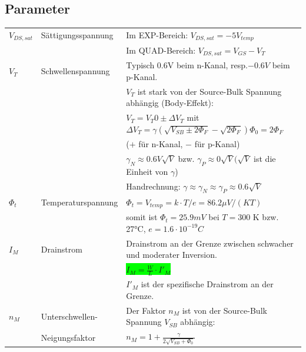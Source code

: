 \subsection{Parameter}
\begin{tabular}{| l | l | l |}
    \hline
    $V_{DS,sat}$    & Sättigungsspannung    & Im EXP-Bereich: $V_{DS,sat} = -5 V_{temp}$\\
                    &                       & Im QUAD-Bereich: $V_{DS,sat} = V_{GS} - V_T$\\
    \hline
    $V_T$           & Schwellenspannung     & Typisch 0.6V beim n-Kanal, resp.$-0.6V$ beim p-Kanal.\\
                    &                       & $V_T$ ist stark von der Source-Bulk Spannung abhängig (Body-Effekt):\\
                    &                       & $V_T = V_T0 \pm \Delta V_T$ mit $\Delta V_T = \gamma(\sqrt{V_{SB}\pm 2\Phi_F}-\sqrt{2\Phi_F})$\hspace{10pt}$\Phi_0 = 2\Phi_F$ \\ 
                    &                       & ($+$ für n-Kanal, $-$ für p-Kanal)\\
                    &                       & $\gamma_N \approx 0.6V\sqrt{V}$ bzw. $\gamma_P \approx 0\sqrt{V} (\sqrt{V}$ ist die Einheit von $\gamma$)\\
                    &                       & Handrechnung: $\gamma \approx\gamma_N \approx\gamma_P\approx 0.6\sqrt{V}$ \\
    \hline
    $\Phi_t$        & Temperaturspannung    & $\Phi_t = V_{temp} = k\cdot T/e = 86.2\mu V/(K T)$ \\
                    &                       & somit ist $\Phi_t = 25.9 mV$ bei $T = 300$ K bzw. 27°C, $e = 1.6\cdot 10^{-19}C$\\
    \hline
    $I_M$           & Drainstrom            & Drainstrom an der Grenze zwischen schwacher und moderater Inversion. \\
                    &                       & \colorbox{lime}{$I_M = \frac{W}{L}\cdot I'_M$} \\
                    &                       & $I'_M$ ist der spezifische Drainstrom an der Grenze. \\
    \hline
    $n_M$           & Unterschwellen-       & Der Faktor $n_M$ ist von der Source-Bulk Spannung $V_{SB}$ abhängig:\\
                    & Neigungsfaktor        & $n_M = 1 + \frac{\gamma}{2\sqrt{V_{SB}+\Phi_0}}$\\

\end{tabular}
